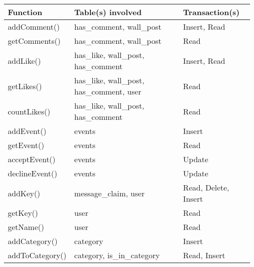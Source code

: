 \begin{center}
    \begin{tabular}{ | p{3cm} | p{5cm} | p{3cm} |}
    \hline
    {\bf Function}        & {\bf Table(s) involved} & {\bf Transaction(s)} \\ \hline
    addComment()    & has\_comment, wall\_post & Insert, Read\\ \hline 
    getComments()   & has\_comment, wall\_post & Read\\ \hline 
    addLike()       & has\_like, wall\_post, has\_comment & Insert, Read\\ \hline 
    getLikes()      & has\_like, wall\_post, has\_comment, user & Read           \\ \hline 
    countLikes()    & has\_like, wall\_post, has\_comment & Read\\ \hline 
    addEvent()      & events            & Insert         \\ \hline 
    getEvent()      & events            & Read           \\ \hline 
    acceptEvent()   & events            & Update         \\ \hline 
    declineEvent()  & events            & Update         \\ \hline 
    addKey()        & message\_claim, user & Read, Delete, Insert\\ \hline 
    getKey()        & user              & Read           \\ \hline 
    getName()       & user              & Read           \\ \hline 
    addCategory()   & category          & Insert         \\ \hline  
    addToCategory() & category, is\_in\_category & Read, Insert\\ \hline 

    \end{tabular}
\end{center}
